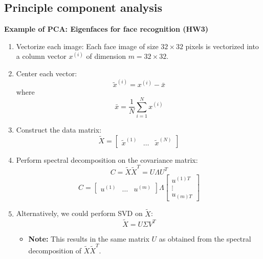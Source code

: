 \subsection{Principle component analysis}
\begin{example}
    \textbf{Example of PCA: Eigenfaces for face recognition (HW3)}
    \begin{enumerate}
        \item Vectorize each image: Each face image of size \( 32 \times 32 \) pixels is vectorized into a column vector \( x^{(i)} \) of dimension \( m = 32 \times 32 \).

        \item Center each vector: 
           \[
           \tilde{x}^{(i)} = x^{(i)} - \bar{x}
           \]
           where 
           \[
           \bar{x} = \frac{1}{N} \sum_{i=1}^{N} x^{(i)}
           \]
        
        \item Construct the data matrix:
           \[
           \tilde{X} = \begin{bmatrix} \tilde{x}^{(1)} & \ldots & \tilde{x}^{(N)} \end{bmatrix}
           \]
        
        \item Perform spectral decomposition on the covariance matrix:
           \[
           C = \tilde{X} \tilde{X}^T = U \Lambda U^T
           \]
           \[
            C= 
            \begin{bmatrix}
            u^{(1)} & \ldots & u^{(m)}
            \end{bmatrix}
            \Lambda
            \begin{bmatrix}
            u^{(1)T} \\
            \vdots \\
            u_{(m)T}
            \end{bmatrix}
            \]
        
        \item Alternatively, we could perform SVD on \( \tilde{X} \):
        \[
        \tilde{X} = U \Sigma V^T
        \]
        \begin{itemize}
            \item \textbf{Note:} This results in the same matrix \( U \) as obtained from the spectral decomposition of \( \tilde{X} \tilde{X}^T \).
        \end{itemize}
    \end{enumerate}
\end{example}


